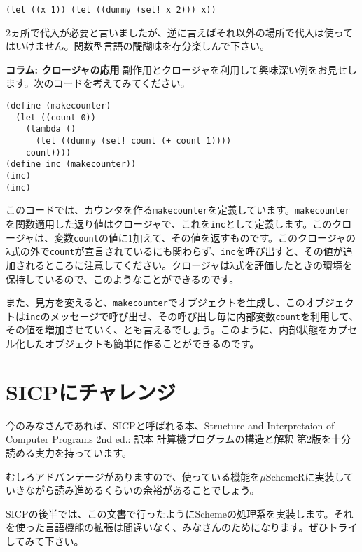 \begin{lstlisting}
(let ((x 1)) (let ((dummy (set! x 2))) x))
\end{lstlisting}

2ヵ所で代入が必要と言いましたが、逆に言えばそれ以外の場所で代入は使って
はいけません。関数型言語の醍醐味を存分楽しんで下さい。

\begin{breakitembox}[l]{\bf コラム: クロージャの応用} \label{column:closure}
副作用とクロージャを利用して興味深い例をお見せします。次のコードを考えてみてください。

\begin{lstlisting}
(define (makecounter)
  (let ((count 0))
    (lambda ()
      (let ((dummy (set! count (+ count 1))))
	count))))
(define inc (makecounter))
(inc)
(inc)
\end{lstlisting}

このコードでは、カウンタを作る{\tt makecounter}を定義しています。{\tt makecounter}を関数適用した返り値はクロージャで、これを{\tt inc}として定義します。このクロージャは、変数{\tt count}の値に1加えて、その値を返すものです。このクロージャのλ式の外で{\tt count}が宣言されているにも関わらず、{\tt inc}を呼び出すと、その値が追加されるところに注意してください。クロージャはλ式を評価したときの環境を保持しているので、このようなことができるのです。

また、見方を変えると、{\tt makecounter}でオブジェクトを生成し、このオブジェクトは{\tt inc}のメッセージで呼び出せ、その呼び出し毎に内部変数{\tt count}を利用して、その値を増加させていく、とも言えるでしょう。このように、内部状態をカプセル化したオブジェクトも簡単に作ることができるのです。
\end{breakitembox}

\section{SICPにチャレンジ}
今のみなさんであれば、SICPと呼ばれる本、Structure and Interpretaion of Computer Programs 2nd ed.: 訳本 計算機プログラムの構造と解釈 第2版\cite{SICP}を十分読める実力を持っています。

むしろアドバンテージがありますので、使っている機能を$\mu$SchemeRに実装していきながら読み進めるくらいの余裕があることでしょう。

SICPの後半では、この文書で行ったようにSchemeの処理系を実装します。それを使った言語機能の拡張は間違いなく、みなさんのためになります。ぜひトライしてみて下さい。


